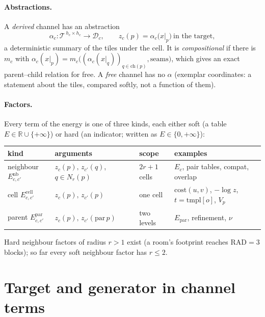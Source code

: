 \documentclass[11pt]{article}
\newcommand{\R}{\mathbb{R}}
\newcommand{\1}{\mathds{1}}
\newcommand{\Dom}{\mathcal{D}}
\begin{document}
\paragraph{Abstractions.} A \emph{derived} channel has an abstraction
\[
  \alpha_c : \mathcal T^{\,h_c \times h_c} \to \Dom_c,
  \qquad z_c(p) = \alpha_c\big(x|_{p}\big)\ \text{in the target},
\]
a deterministic summary of the tiles under the cell. It is \emph{compositional}
if there is $m_c$ with $\alpha_c(x|_p) = m_c\big((\alpha_c(x|_q))_{q \in \mathrm{ch}(p)},
\text{seams}\big)$, which gives an exact parent--child relation for free. A
\emph{free} channel has no $\alpha$ (exemplar coordinates: a statement about the
tiles, compared softly, not a function of them).

\paragraph{Factors.} Every term of the energy is one of three kinds, each either
soft (a table $E \in \R \cup \{+\infty\}$) or hard (an indicator; written as
$E \in \{0, +\infty\}$):
\begin{center}
\small
\begin{tabular}{@{}llll@{}}
\toprule
kind & arguments & scope & examples \\
\midrule
neighbour $E^{\mathrm{nb}}_{c,c'}$ & $z_c(p),\, z_{c'}(q)$, $q \in N_{r}(p)$ & $2r+1$ cells & $E_c$, pair tables, compat, overlap \\
cell $E^{\mathrm{cell}}_{c,c'}$ & $z_c(p),\, z_{c'}(p)$ & one cell & $\mathrm{cost}(u,v)$, $-\log z$, $t = \mathrm{tmpl}[o]$, $V_p$ \\
parent $E^{\mathrm{par}}_{c,c'}$ & $z_c(p),\, z_{c'}(\mathrm{par}\,p)$ & two levels & $E_{\mathrm{par}}$, refinement, $\nu$ \\
\bottomrule
\end{tabular}
\end{center}
Hard neighbour factors of radius $r > 1$ exist (a room's footprint reaches
$\mathrm{RAD} = 3$ blocks); so far every soft neighbour factor has $r \le 2$.

\section{Target and generator in channel terms}
\end{document}
